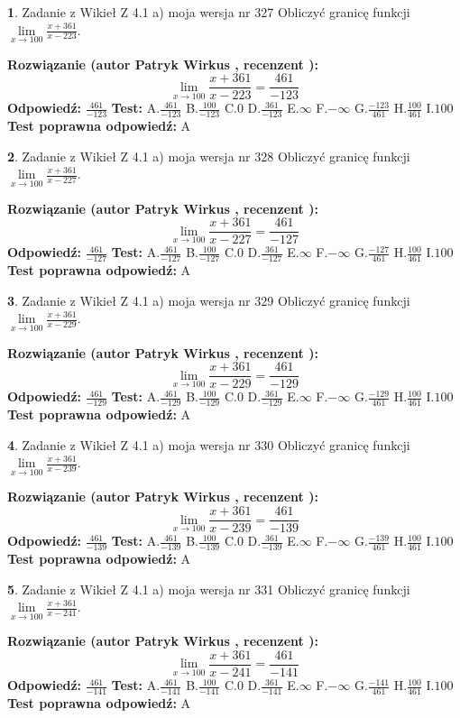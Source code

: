 \documentclass[12pt, a4paper]{article}
\theoremstyle{definition} %
\newtheorem{zad}{}
\newcommand{\zadStart}[1]{\begin{zad}#1\newline}
\newcommand{\zadStop}{\end{zad}}
\newcommand{\rozwStart}[2]{\noindent \textbf{Rozwiązanie (autor #1 , recenzent #2): }\newline}
\newcommand{\rozwStop}{\newline}
\newcommand{\odpStart}{\noindent \textbf{Odpowiedź:}\newline}
\newcommand{\odpStop}{\newline}
\newcommand{\testStart}{\noindent \textbf{Test:}\newline}
\newcommand{\testStop}{\newline}
\newcommand{\kluczStart}{\noindent \textbf{Test poprawna odpowiedź:}\newline}
\newcommand{\kluczStop}{\newline}
\begin{document}
\zadStart{Zadanie z Wikieł Z 4.1 a) moja wersja nr 327}
Obliczyć granicę funkcji $\lim\limits_{x\to100}\frac{x+361}{x-223}$.
\zadStop
\rozwStart{Patryk Wirkus}{}
$$\lim\limits_{x\to100}\frac{x+361}{x-223} = \frac{461}{-123}$$
\rozwStop
\odpStart
$\frac{461}{-123}$
\odpStop
\testStart
A.$\frac{461}{-123}$
B.$\frac{100}{-123}$
C.$0$
D.$\frac{361}{-123}$
E.$\infty$
F.$-\infty$
G.$\frac{-123}{461}$
H.$\frac{100}{461}$
I.$100$
\testStop
\kluczStart
A
\kluczStop



\zadStart{Zadanie z Wikieł Z 4.1 a) moja wersja nr 328}
Obliczyć granicę funkcji $\lim\limits_{x\to100}\frac{x+361}{x-227}$.
\zadStop
\rozwStart{Patryk Wirkus}{}
$$\lim\limits_{x\to100}\frac{x+361}{x-227} = \frac{461}{-127}$$
\rozwStop
\odpStart
$\frac{461}{-127}$
\odpStop
\testStart
A.$\frac{461}{-127}$
B.$\frac{100}{-127}$
C.$0$
D.$\frac{361}{-127}$
E.$\infty$
F.$-\infty$
G.$\frac{-127}{461}$
H.$\frac{100}{461}$
I.$100$
\testStop
\kluczStart
A
\kluczStop



\zadStart{Zadanie z Wikieł Z 4.1 a) moja wersja nr 329}
Obliczyć granicę funkcji $\lim\limits_{x\to100}\frac{x+361}{x-229}$.
\zadStop
\rozwStart{Patryk Wirkus}{}
$$\lim\limits_{x\to100}\frac{x+361}{x-229} = \frac{461}{-129}$$
\rozwStop
\odpStart
$\frac{461}{-129}$
\odpStop
\testStart
A.$\frac{461}{-129}$
B.$\frac{100}{-129}$
C.$0$
D.$\frac{361}{-129}$
E.$\infty$
F.$-\infty$
G.$\frac{-129}{461}$
H.$\frac{100}{461}$
I.$100$
\testStop
\kluczStart
A
\kluczStop



\zadStart{Zadanie z Wikieł Z 4.1 a) moja wersja nr 330}
Obliczyć granicę funkcji $\lim\limits_{x\to100}\frac{x+361}{x-239}$.
\zadStop
\rozwStart{Patryk Wirkus}{}
$$\lim\limits_{x\to100}\frac{x+361}{x-239} = \frac{461}{-139}$$
\rozwStop
\odpStart
$\frac{461}{-139}$
\odpStop
\testStart
A.$\frac{461}{-139}$
B.$\frac{100}{-139}$
C.$0$
D.$\frac{361}{-139}$
E.$\infty$
F.$-\infty$
G.$\frac{-139}{461}$
H.$\frac{100}{461}$
I.$100$
\testStop
\kluczStart
A
\kluczStop



\zadStart{Zadanie z Wikieł Z 4.1 a) moja wersja nr 331}
Obliczyć granicę funkcji $\lim\limits_{x\to100}\frac{x+361}{x-241}$.
\zadStop
\rozwStart{Patryk Wirkus}{}
$$\lim\limits_{x\to100}\frac{x+361}{x-241} = \frac{461}{-141}$$
\rozwStop
\odpStart
$\frac{461}{-141}$
\odpStop
\testStart
A.$\frac{461}{-141}$
B.$\frac{100}{-141}$
C.$0$
D.$\frac{361}{-141}$
E.$\infty$
F.$-\infty$
G.$\frac{-141}{461}$
H.$\frac{100}{461}$
I.$100$
\testStop
\kluczStart
A
\kluczStop
\end{document}
